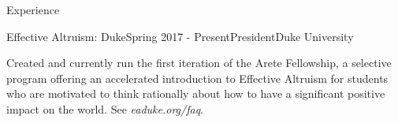 \documentclass{resume} %
\begin{document}
\begin{rSection}{Experience}


\begin{rSubsection}{Effective Altruism: Duke}{Spring 2017 - Present}{President}{Duke University}
\item Created and currently run the first iteration of the Arete Fellowship, a selective program offering an accelerated introduction to Effective Altruism for students who are motivated to think rationally about how to have a significant positive impact on the world. See \textit{eaduke.org/faq}.
\end{rSubsection}

\end{rSection}



\end{document}
